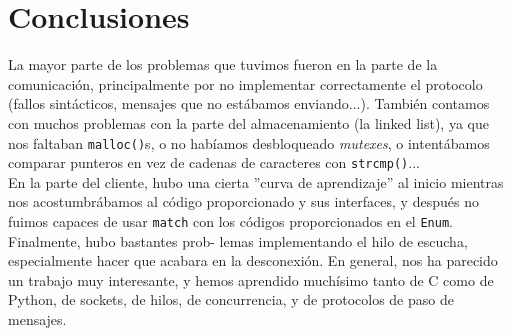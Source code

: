 \section{Conclusiones}

La mayor parte de los problemas que tuvimos fueron en la parte de la comunicación, principalmente por no implementar correctamente el protocolo (fallos sintácticos, mensajes que no estábamos enviando...). También contamos con muchos problemas con la parte del almacenamiento (la linked list), ya que nos faltaban \texttt{malloc()}s, o no habíamos desbloqueado \textit{mutexes}, o intentábamos comparar punteros en vez de cadenas de caracteres con \texttt{strcmp()}...\\

En la parte del cliente, hubo una cierta ”curva de aprendizaje” al inicio mientras nos acostumbrábamos al código proporcionado y sus interfaces, y después no fuimos capaces de usar \texttt{match} con los códigos proporcionados en el \texttt{Enum}. Finalmente, hubo bastantes prob- lemas implementando el hilo de escucha, especialmente hacer que acabara en la desconexión. En general, nos ha parecido un trabajo muy interesante, y hemos aprendido muchísimo tanto de C como de Python, de sockets, de hilos, de concurrencia, y de protocolos de paso de mensajes.